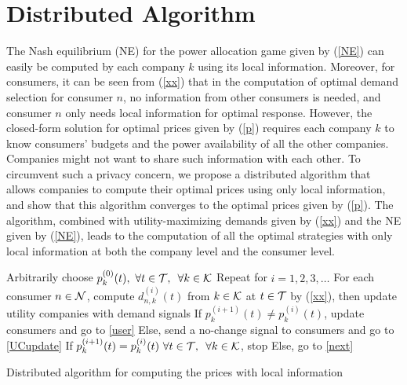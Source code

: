 
\section{{\color{black}Distributed Algorithm} }\label{algorithm}
The Nash equilibrium (NE) for the power allocation game given by (\ref{NE}) can easily be computed by each company $k$ using its local information. Moreover, for consumers, it can be seen from (\ref{xx}) that in the computation of optimal demand selection for consumer $n$, no information from other consumers is needed, and consumer $n$ only needs local information for optimal response. However, the closed-form solution for optimal prices given by (\ref{p}) requires each company $k$ to know consumers' budgets and the power availability of all the other companies. Companies might not want to share such information with each other. To circumvent such a privacy concern, we propose a distributed algorithm that allows companies to compute their optimal prices using only local information, and show that this algorithm converges to the optimal prices given by  (\ref{p}). The algorithm, combined with utility-maximizing demands given by (\ref{xx}) and the NE given by (\ref{NE}), leads to the computation of all the optimal strategies with only local information at both the company level and the consumer level. 
\begin{algorithm}
\begin{algorithmic}[1]
\State Arbitrarily choose $p^{(0)}_k(t) ,\,\,\forall t\in{\cal T}, \,\,\,\forall k\in{\cal K}$ 
\State Repeat for $i=1, 2,3,\dots$ \label{next}
\State For each consumer $n \in {\cal N}$, compute $d^{(i)}_{n,k}(t)$ from  $k\in{\cal K}$ at  $t\in{\cal T}$ by (\ref{xx}), then update utility companies with demand signals\label{user}
\State If $p^{(i+1)}_k(t)\neq p^{(i)}_k(t)$, update consumers and go to \ref{user}
\State Else, send a no-change signal to consumers and go to \ref{UCupdate}
\State If $p^{(i+1)}_k(t) = p^{(i)}_k(t)\,
\,\forall t\in{\cal T}, \,\,\,\forall k\in{\cal K}$, stop 
\State Else, go to \ref{next}
\end{algorithmic}
\caption{Distributed algorithm for computing the prices with local information} 
\end{algorithm}

